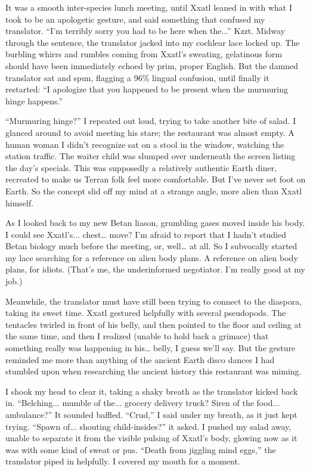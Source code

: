 It was a smooth inter-species lunch meeting, until Xxatl leaned in with
what I took to be an apologetic gesture, and said something that
confused my translator. ``I'm terribly sorry you had to be here when
the...'' Kzzt. Midway through the sentence, the translator jacked into
my cochlear lace locked up. The burbling whirrs and rumbles coming from
Xxatl's sweating, gelatinous form should have been immediately echoed by
prim, proper English. But the damned translator sat and spun, flagging a
96\% lingual confusion, until finally it restarted: ``I apologize that
you happened to be present when the murmuring hinge happens.''

``Murmuring hinge?'' I repeated out loud, trying to take another bite of
salad. I glanced around to avoid meeting his stare; the restaurant was
almost empty. A human woman I didn't recognize sat on a stool in the
window, watching the station traffic. The waiter child was slumped over
underneath the screen listing the day's specials. This was supposedly a
relatively authentic Earth diner, recreated to make us Terran folk feel
more comfortable. But I've never set foot on Earth. So the concept slid
off my mind at a strange angle, more alien than Xxatl himself.

As I looked back to my new Betan liason, grumbling gases moved inside
his body. I could see Xxatl's... chest\ldots{} move? I'm afraid to
report that I hadn't studied Betan biology much before the meeting, or,
well\ldots{} at all. So I subvocally started my lace searching for a
reference on alien body plans. A reference on alien body plans, for
idiots. (That's me, the underinformed negotiator. I'm really good at my
job.)

Meanwhile, the translator must have still been trying to connect to the
diaspora, taking its sweet time. Xxatl gestured helpfully with several
pseudopods. The tentacles twirled in front of his belly, and then
pointed to the floor and ceiling at the same time, and then I realized
(unable to hold back a grimace) that something really was happening in
his\ldots{} belly, I guess we'll say. But the gesture reminded me more
than anything of the ancient Earth disco dances I had stumbled upon when
researching the ancient history this restaurant was miming.

I shook my head to clear it, taking a shaky breath as the translator
kicked back in. ``Belching... mumble of the... grocery delivery truck?
Siren of the food... ambulance?'' It sounded baffled. ``Crud,'' I said
under my breath, as it just kept trying. ``Spawn of... shouting
child-insides?'' it asked. I pushed my salad away, unable to separate it
from the visible pulsing of Xxatl's body, glowing now as it was with
some kind of sweat or pus. ``Death from jiggling mind eggs,'' the
translator piped in helpfully. I covered my mouth for a moment.

